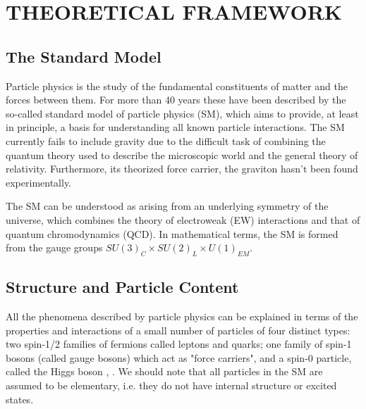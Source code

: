 %
%
%
%



\chapter{THEORETICAL FRAMEWORK}
\section{The Standard Model}
Particle physics is the study of the fundamental constituents of matter and the forces between them. For more than 40 years these have been described by the so-called standard model of particle physics (SM), which aims to provide, at least in principle, a basis for understanding all known particle interactions. The SM currently fails to include gravity due to the difficult task of combining the quantum theory used to describe the microscopic world and the general theory of relativity. Furthermore, its theorized force carrier, the graviton hasn't been found experimentally.

The SM can be understood as arising from an underlying symmetry of the universe, which combines the theory of electroweak (EW) interactions and that of quantum chromodynamics (QCD). In mathematical terms, the SM is formed from the gauge groups $SU(3)_{C}\times SU(2)_{L} \times U(1)_{EM}$. 

\section{Structure and Particle Content}
All the phenomena described by particle physics can be explained in terms of the properties and interactions of a small number of particles of four distinct types: two spin-1/2 families of fermions called leptons and quarks; one family of spin-1 bosons (called gauge bosons) which act as "force carriers", and a spin-0 particle, called the Higgs boson \cite{20121}, \cite{201230}. We should note that all particles in the SM are assumed to be elementary, i.e. they do not have internal structure or excited states.

